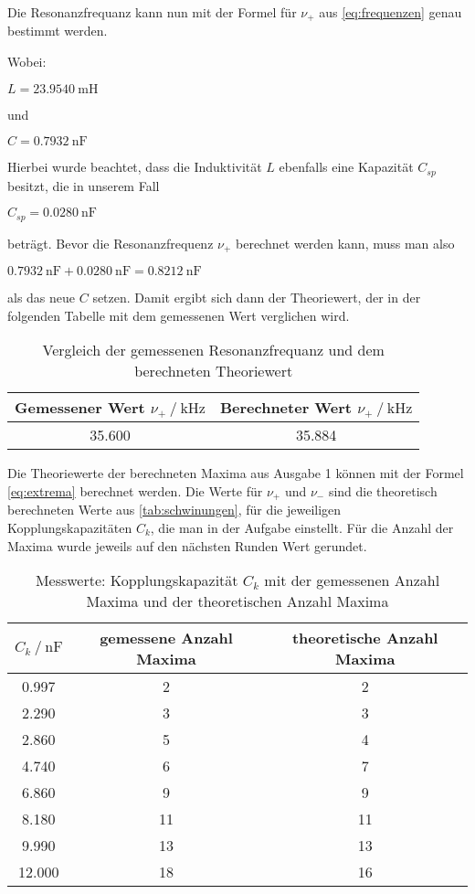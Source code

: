 Die Resonanzfrequanz kann nun mit der Formel für $\nu _+$ aus \autoref{eq:frequenzen} genau bestimmt werden.

Wobei:

$L = \SI{23.9540}{\milli\henry}$ 

und 

$C = \SI{0.7932}{\nano\farad}$

Hierbei wurde beachtet, dass die Induktivität $L$ ebenfalls eine Kapazität $C_{sp}$ besitzt, die in unserem Fall

$C_{sp} = \SI{0.0280}{\nano\farad}$ 

beträgt.
Bevor die Resonanzfrequenz $\nu _+$ berechnet werden kann, muss man also

$\SI{0.7932}{\nano\farad} + \SI{0.0280}{\nano\farad} = \SI{0.8212}{\nano\farad}$

als das neue $C$ setzen.
Damit ergibt sich dann der Theoriewert, der in der folgenden Tabelle mit dem gemessenen Wert verglichen wird.

\begin{table}
  \centering
  \caption{Vergleich der gemessenen Resonanzfrequanz und dem berechneten Theoriewert}
  \label{tab:resonanz}
  \begin{tabular}{c c}
    \toprule 
    Gemessener Wert $\nu _+ \:/\: \si{\kilo\hertz}$ & Berechneter Wert $\nu _+ \:/\: \si{\kilo\hertz}$    \\ 
    \midrule 
    35.600 & 35.884 \\
    \bottomrule
  \end{tabular}
\end{table}

Die Theoriewerte der berechneten Maxima aus Ausgabe 1 können mit der Formel \autoref{eq:extrema} berechnet werden. Die Werte für $\nu _+$ und $\nu _-$ sind die theoretisch berechneten Werte aus \autoref{tab:schwinungen}, für die jeweiligen Kopplungskapazitäten $C_k$, die man in der Aufgabe einstellt. Für die Anzahl der Maxima wurde jeweils auf den nächsten Runden Wert gerundet.

\begin{table}
  \centering
  \caption{Messwerte: Kopplungskapazität $C_k $ mit der gemessenen Anzahl Maxima und der theoretischen Anzahl Maxima }
  \label{tab:schwebungstheorie}
  \begin{tabular}{c c c}
    \toprule 
    $C_k \:/\: \si{\nano\farad}$ & gemessene Anzahl Maxima &  theoretische Anzahl Maxima   \\ 
    \midrule 
    0.997 & 2 & 2 \\
    2.290 & 3 & 3 \\
    2.860 & 5 & 4 \\
    4.740 & 6 & 7 \\
    6.860 & 9 & 9 \\
    8.180 & 11 & 11 \\
    9.990 & 13 & 13 \\
    12.000 & 18 & 16 \\
    \bottomrule
  \end{tabular}
\end{table}

